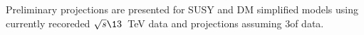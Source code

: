 Preliminary projections are presented for SUSY and DM
simplified models using currently recoreded $\sqrt{s}\13$~TeV data and 
projections assuming $3$\ifb of data.




